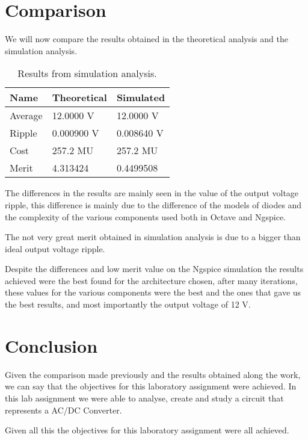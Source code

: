 \newpage
\section{Comparison}
\label{sec:comparison}
\par
We will now compare the results obtained in the theoretical analysis and the simulation analysis.\par
\par
\begin{table}[h]
	\centering
	\begin{tabular}{|l|l|l|}
	\hline
	\textbf{Name} & \textbf{Theoretical} & \textbf{Simulated} \\ \hline
	Average  & 12.0000 V  & 12.0000 V  \\ \hline
	Ripple  & 0.000900 V & 0.008640 V  \\ \hline
	Cost  & 257.2 MU  & 257.2 MU  \\ \hline
	Merit  & 4.313424  & 0.4499508  \\ \hline
	\end{tabular}
	\caption{Results from simulation analysis.}
	\label{tab:valuessim}
\end{table}

The differences in the results are mainly seen in the value of the output voltage ripple, this difference is mainly due to the difference of the models of diodes and the complexity of the various components used both in Octave and Ngspice.\par

The not very great merit obtained in simulation analysis is due to a bigger than ideal output voltage ripple.

Despite the differences and low merit value on the Ngspice simulation the results achieved were the best found for the architecture chosen, after many iterations, these values for the various components were the best and the ones that gave us the best results, and most importantly the output voltage of 12 V.


\newpage
\section{Conclusion}
\label{sec:conclusion}

Given the comparison made previously and the results obtained along the work, we can say that the objectives for this laboratory assignment were achieved. In this lab assignment we were able to analyse, create and study a circuit that represents a AC/DC Converter.\par
Given all this the objectives for this laboratory assignment were all achieved.
